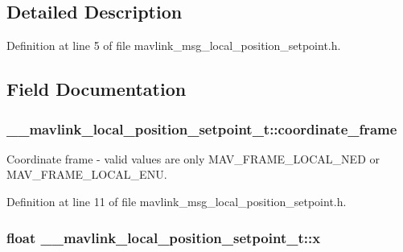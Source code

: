 \subsection{Detailed Description}


Definition at line 5 of file mavlink\-\_\-msg\-\_\-local\-\_\-position\-\_\-setpoint.\-h.



\subsection{Field Documentation}
\hypertarget{struct____mavlink__local__position__setpoint__t_a1d1374da97eaf4caf6caa5fb431187ed}{
\subsubsection[{coordinate\-\_\-frame}]{ \-\_\-\-\_\-mavlink\-\_\-local\-\_\-position\-\_\-setpoint\-\_\-t\-::coordinate\-\_\-frame}}\label{struct____mavlink__local__position__setpoint__t_a1d1374da97eaf4caf6caa5fb431187ed}


Coordinate frame -\/ valid values are only M\-A\-V\-\_\-\-F\-R\-A\-M\-E\-\_\-\-L\-O\-C\-A\-L\-\_\-\-N\-E\-D or M\-A\-V\-\_\-\-F\-R\-A\-M\-E\-\_\-\-L\-O\-C\-A\-L\-\_\-\-E\-N\-U. 



Definition at line 11 of file mavlink\-\_\-msg\-\_\-local\-\_\-position\-\_\-setpoint.\-h.

\hypertarget{struct____mavlink__local__position__setpoint__t_a206e5fcf77dca173815edd4e9c5cfb2c}{
\subsubsection[{x}]{\setlength{\rightskip}{0pt plus 5cm}float \-\_\-\-\_\-mavlink\-\_\-local\-\_\-position\-\_\-setpoint\-\_\-t\-::x}}\label{struct____mavlink__local__position__setpoint__t_a206e5fcf77dca173815edd4e9c5cfb2c}


